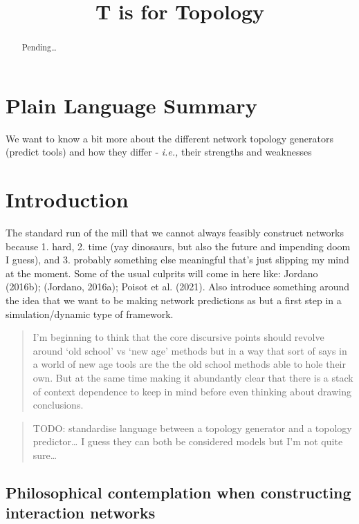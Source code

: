 \documentclass[
]{agujournal2019}
\begin{document}
\title{T is for Topology}



\begin{abstract}
Pending\ldots{}
\end{abstract}

\section*{Plain Language Summary}
We want to know a bit more about the different network topology
generators (predict tools) and how they differ - \emph{i.e.,} their
strengths and weaknesses



\section{Introduction}\label{introduction}

The standard run of the mill that we cannot always feasibly construct
networks because 1. hard, 2. time (yay dinosaurs, but also the future
and impending doom I guess), and 3. probably something else meaningful
that's just slipping my mind at the moment. Some of the usual culprits
will come in here like: Jordano (2016b); (Jordano, 2016a); Poisot et al.
(2021). Also introduce something around the idea that we want to be
making network predictions as but a first step in a simulation/dynamic
type of framework.

\begin{quote}
I'm beginning to think that the core discursive points should revolve
around `old school' vs `new age' methods but in a way that sort of says
in a world of new age tools are the the old school methods able to hole
their own. But at the same time making it abundantly clear that there is
a stack of context dependence to keep in mind before even thinking about
drawing conclusions.
\end{quote}

\begin{quote}
TODO: standardise language between a topology generator and a topology
predictor\ldots{} I guess they can both be considered models but I'm not
quite sure\ldots{}
\end{quote}

\subsection{Philosophical contemplation when constructing interaction
networks}\label{philosophical-contemplation-when-constructing-interaction-networks}
\end{document}
